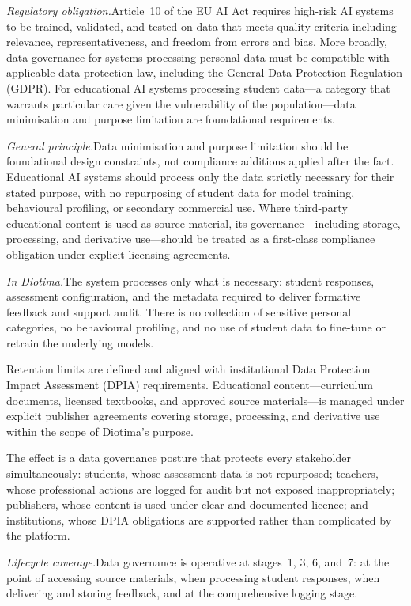 \documentclass[10pt, a4paper, twocolumn]{article}
\begin{document}
\textit{Regulatory obligation.}\quad Article~10 of the EU AI Act requires high-risk AI
systems to be trained, validated, and tested on data that meets quality criteria
including relevance, representativeness, and freedom from errors and bias. More broadly,
data governance for systems processing personal data must be compatible with applicable
data protection law, including the General Data Protection Regulation (GDPR). For
educational AI systems processing student data---a category that warrants particular
care given the vulnerability of the population---data minimisation and purpose
limitation are foundational requirements.

\textit{General principle.}\quad Data minimisation and purpose limitation should be
foundational design constraints, not compliance additions applied after the fact.
Educational AI systems should process only the data strictly necessary for their stated
purpose, with no repurposing of student data for model training, behavioural profiling,
or secondary commercial use. Where third-party educational content is used as source
material, its governance---including storage, processing, and derivative use---should
be treated as a first-class compliance obligation under explicit licensing agreements.

\textit{In Diotima.}\quad The system processes only what is necessary: student responses,
assessment configuration, and the metadata required to deliver formative feedback and
support audit. There is no collection of sensitive personal categories, no behavioural
profiling, and no use of student data to fine-tune or retrain the underlying models.

Retention limits are defined and aligned with institutional Data Protection Impact
Assessment (DPIA) requirements. Educational content---curriculum documents, licensed
textbooks, and approved source materials---is managed under explicit publisher
agreements covering storage, processing, and derivative use within the scope of
Diotima's purpose.

The effect is a data governance posture that protects every stakeholder simultaneously:
students, whose assessment data is not repurposed; teachers, whose professional actions
are logged for audit but not exposed inappropriately; publishers, whose content is
used under clear and documented licence; and institutions, whose DPIA obligations are
supported rather than complicated by the platform.

\textit{Lifecycle coverage.}\quad Data governance is operative at stages~1, 3, 6,
and~7: at the point of accessing source materials, when processing student responses,
when delivering and storing feedback, and at the comprehensive logging stage.
\end{document}
